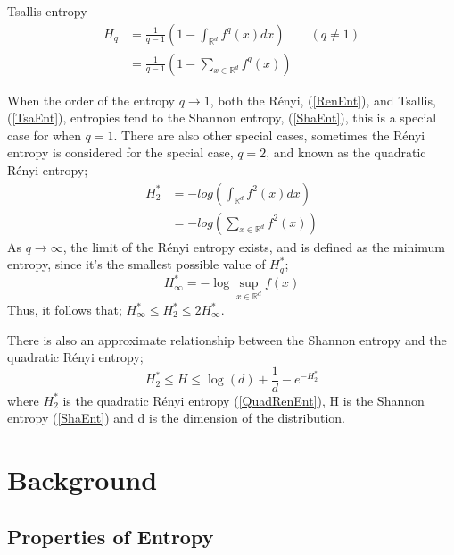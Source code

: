\documentclass{report}
\begin{document}
Tsallis entropy
\begin{align} 
H_{q} &= \frac{1}{q-1} \left(1 - \int_{\mathbb{R}^d} f^q (x) dx \right)  \quad  \quad (q \neq 1) \label{TsaEnt} \\
&=  \frac{1}{q-1} \left(1 - \sum_{x \in \mathbb{R}^d} f^q (x) \right) \nonumber 
\end{align}

When the order of the entropy $q \to 1$, both the R\'enyi, (\ref{RenEnt}), and Tsallis, (\ref{TsaEnt}), entropies tend to the Shannon entropy, (\ref{ShaEnt}), this is a special case for when $q=1$. There are also other special cases, sometimes the R\'enyi entropy is considered for the special case, $q=2$, and known as the quadratic R\'enyi entropy;
\begin{align} 
H_{2}^{*} &= - log\left( \int_{\mathbb{R}^{d}} f^2(x) dx \right) \label{QuadRenEnt} \\
&= - log \left( \sum_{x \in \mathbb{R}^d} f^2 (x) \right) \nonumber 
\end{align}
As $q \to \infty$, the limit of the R\'enyi entropy exists, and is defined as the minimum entropy, since it's the smallest possible value of $H_{q}^{*}$;
\begin{equation}
H_{\infty}^{*} = - \log \sup_{x \in \mathbb{R}^d} f (x) \nonumber
\end{equation}
Thus, it follows that; $H_{\infty}^{*} \leq H_{2}^{*} \leq 2H_{\infty}^{*}$.

There is also an approximate relationship between the Shannon entropy and the quadratic R\'enyi entropy;
\begin{equation}
H_{2}^{*} \leq H \leq \log(d) + \frac{1}{d} - e^{-H_{2}^{*}} \nonumber
\end{equation}
where $H_{2}^{*}$ is the quadratic R\'enyi entropy (\ref{QuadRenEnt}), H is the Shannon entropy (\ref{ShaEnt}) and d is the dimension of the distribution.


\chapter{Background}


\section{Properties of Entropy} \label{entropyProperties}
\end{document}
